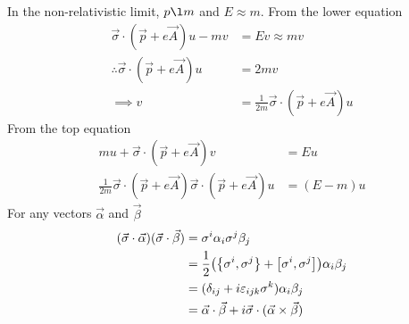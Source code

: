 \documentclass[12pt,a4paper,titlepage]{article}
\begin{document}
In the non-relativistic limit, $p\l m$ and $E\approx m$. From the lower equation
\begin{equation}
\begin{aligned}
\vec{\sigma}\cdot(\vec{p}+e\vec{A})u-mv&=Ev\approx mv\\
\therefore \vec{\sigma}\cdot(\vec{p}+e\vec{A})u&=2mv\\
\implies v&=\frac{1}{2m}\vec{\sigma}\cdot(\vec{p}+e\vec{A})u
\end{aligned}
\end{equation}
From the top equation
\begin{equation}
\begin{aligned}
mu+\vec{\sigma}\cdot(\vec{p}+e\vec{A})v&=Eu\\
\frac{1}{2m}\vec{\sigma}\cdot(\vec{p}+e\vec{A})\vec{\sigma}\cdot(\vec{p}+e\vec{A})u&=(E-m)u
\end{aligned}
\end{equation}
For any vectors $\vec{\alpha}$ and $\vec{\beta}$
\begin{equation}
\begin{aligned}
(\vec{\sigma}\cdot\vec{\alpha})(\vec{\sigma}\cdot\vec{\beta})&=\sigma^{i}\alpha_{i}\sigma^{j}\beta_{j}\\
&=\frac{1}{2}\qty(\acomm{\sigma^{i}}{\sigma^{j}}+\comm{\sigma^{i}}{\sigma^{j}})\alpha_{i}\beta_{j}\\
&=(\delta_{ij}+i\varepsilon_{ijk}\sigma^{k})\alpha_{i}\beta_{j}\\
&=\vec{\alpha}\cdot\vec{\beta}+i\vec{\sigma}\cdot(\vec{\alpha}\times\vec{\beta})
\end{aligned}
\end{equation}
\end{document}
